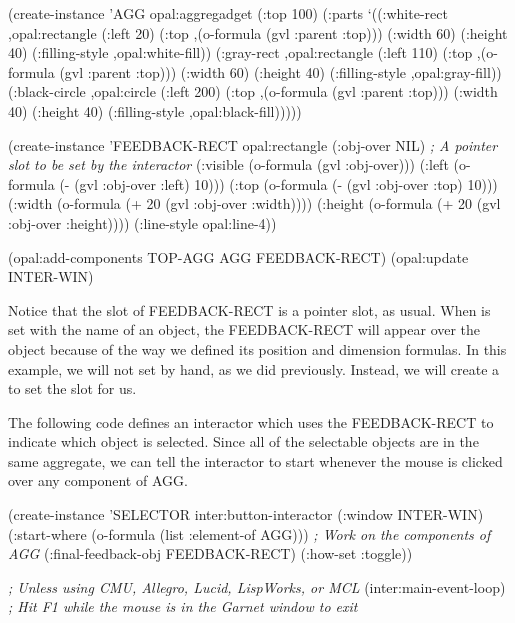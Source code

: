 \begin{programexample}
(create-instance 'AGG opal:aggregadget
   (:top 100)
   (:parts
    `((:white-rect ,opal:rectangle
                   (:left 20)
                   (:top ,(o-formula (gvl :parent :top)))
                   (:width 60)
                   (:height 40)
                   (:filling-style ,opal:white-fill))
      (:gray-rect ,opal:rectangle
                  (:left 110)
                  (:top ,(o-formula (gvl :parent :top)))
                  (:width 60)
                  (:height 40)
                  (:filling-style ,opal:gray-fill))
      (:black-circle ,opal:circle
                     (:left 200)
                     (:top ,(o-formula (gvl :parent :top)))
                     (:width 40)
                     (:height 40)
                     (:filling-style ,opal:black-fill)))))

(create-instance 'FEEDBACK-RECT opal:rectangle
   (:obj-over NIL)  {\it ; A pointer slot to be set by the interactor}
   (:visible (o-formula (gvl :obj-over)))
   (:left (o-formula (- (gvl :obj-over :left) 10)))
   (:top (o-formula (- (gvl :obj-over :top) 10)))
   (:width (o-formula (+ 20 (gvl :obj-over :width))))
   (:height (o-formula (+ 20 (gvl :obj-over :height))))
   (:line-style opal:line-4))

(opal:add-components TOP-AGG AGG FEEDBACK-RECT)
(opal:update INTER-WIN)
\end{programexample}

Notice that the  slot of FEEDBACK-RECT is a pointer
slot, as usual.  When  is set with the name of an
object, the FEEDBACK-RECT will appear over the object because of the
way we defined its position and dimension formulas.  In this example,
we will not set  by hand, as we did previously.
Instead, we will create a  to set the slot for us.

The following code defines an interactor which uses the FEEDBACK-RECT
to indicate which object is selected.  Since all of the selectable
objects are in the same aggregate, we can tell the interactor to start
whenever the mouse is clicked over any component of AGG.

\begin{programexample}
(create-instance 'SELECTOR inter:button-interactor
   (:window INTER-WIN)
   (:start-where (o-formula (list :element-of AGG)))  {\it ; Work on the components of AGG}
   (:final-feedback-obj FEEDBACK-RECT)
   (:how-set :toggle))

{\it ; Unless using CMU, Allegro, Lucid, LispWorks, or MCL}
(inter:main-event-loop)
{\it ; Hit F1 while the mouse is in the Garnet window to exit}
\end{programexample}

